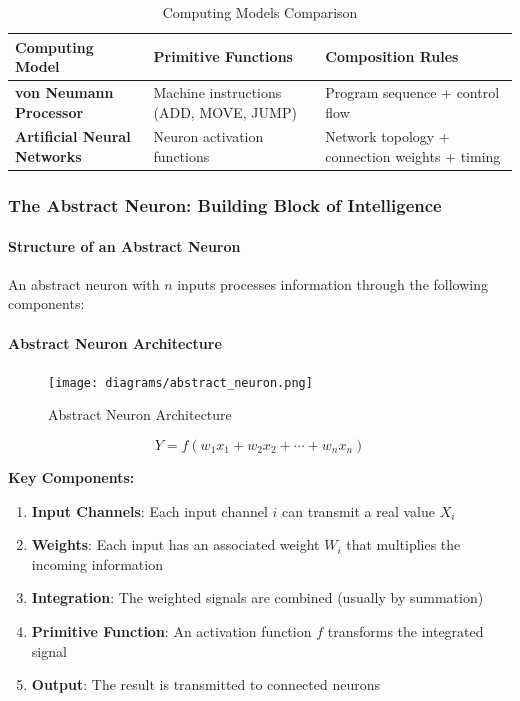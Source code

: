 \begin{table}[h!]
\centering
\begin{tabular}{|p{4cm}|p{4cm}|p{4cm}|}
\hline
\textbf{Computing Model} & \textbf{Primitive Functions} & \textbf{Composition Rules} \\
\hline
\textbf{von Neumann Processor} & Machine instructions (ADD, MOVE, JUMP) & Program sequence + control flow \\
\hline
\textbf{Artificial Neural Networks} & Neuron activation functions & Network topology + connection weights + timing \\
\hline
\end{tabular}
\caption{Computing Models Comparison}
\label{tab:computing-models-comparison}
\end{table}

\subsubsection{The Abstract Neuron: Building Block of Intelligence}
\label{subsubsec:abstract-neuron}

\paragraph{Structure of an Abstract Neuron}
\label{para:structure-abstract-neuron}

An abstract neuron with $n$ inputs processes information through the following components:

\paragraph{Abstract Neuron Architecture}
\label{para:abstract-neuron-architecture}

\begin{figure}[h!]
\centering
\texttt{[image: diagrams/abstract\_neuron.png]}
\caption{Abstract Neuron Architecture}
\label{fig:abstract-neuron}
\end{figure}

\begin{equation}
\label{eq:neuron-output}
Y = f\left(w_1 x_1 + w_2 x_2 + \cdots + w_n x_n\right)
\end{equation}

\textbf{Key Components:}

\begin{enumerate}
\item \textbf{Input Channels}: Each input channel $i$ can transmit a real value $X_i$
\item \textbf{Weights}: Each input has an associated weight $W_i$ that multiplies the incoming information
\item \textbf{Integration}: The weighted signals are combined (usually by summation)
\item \textbf{Primitive Function}: An activation function $f$ transforms the integrated signal
\item \textbf{Output}: The result is transmitted to connected neurons
\end{enumerate}

